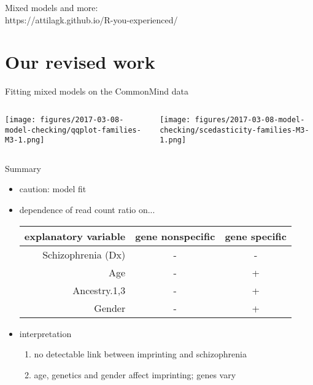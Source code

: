 \documentclass[usenames,dvipsnames]{beamer} %
\begin{document}
\begin{frame}
Mixed models and more:\\
https://attilagk.github.io/R-you-experienced/ 
\end{frame}

\section{Our revised work}

\begin{frame}{Fitting mixed models on the CommonMind data}
\begin{columns}[t]
\begin{column}{0.5\textwidth}

\texttt{[image: figures/2017-03-08-model-checking/qqplot-families-M3-1.png]}
\end{column}

\begin{column}{0.5\textwidth}

\texttt{[image: figures/2017-03-08-model-checking/scedasticity-families-M3-1.png]}
\end{column}
\end{columns}
\end{frame}


\begin{frame}{Summary}
\begin{itemize}
\item caution: model fit
\item<2-> dependence of read count ratio on...
{\footnotesize
\begin{tabular}{r|cc}
explanatory variable & gene nonspecific & gene specific \\
\hline
Schizophrenia (Dx) & - & - \\
Age & - & + \\
Ancestry.{1,3} & - & + \\
Gender & - & + \\
\end{tabular}
}
\item<3> interpretation
\begin{enumerate}
\item no detectable link between imprinting and schizophrenia
\item age, genetics and gender affect imprinting;
genes vary
\end{enumerate}
\end{itemize}
\end{frame}
\end{document}
